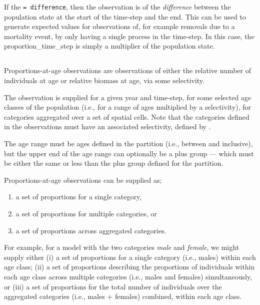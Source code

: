 If the  \texttt{= difference}, then the observation is of the \emph{difference} between the population state at the start of the time-step and the end. This can be used to generate expected values for observations of, for example removals due to a mortality event, by only having a single process in the time-step. In this case, the proportion\_time\_step is simply a multiplier of the population state.

\subsection{}

Proportions-at-age observations are observations of either the relative number of individuals at age or relative biomass at age, via some selectivity. 

The observation is supplied for a given year and time-step, for some selected age classes of the population (i.e., for a range of ages multiplied by a selectivity), for categories aggregated over a set of spatial cells. Note that the categories defined in the observations must have an associated selectivity, defined by .

The age range must be ages defined in the partition (i.e., between  and  inclusive), but the upper end of the age range can optionally be a plus group --- which must be either the same or less than the plus group defined for the partition. 

Proportions-at-age observations can be supplied as; 
\begin{enumerate}
\item a set of proportions for a single category, 
\item a set of proportions for multiple categories, or
\item a set of proportions across aggregated categories.
\end{enumerate}

For example, for a model with the two categories \emph{male} and \emph{female}, we might supply either (i) a set of proportions for a single category (i.e., males) within each age class; (ii) a set of proportions describing the proportions of individuals within each age class across multiple categories (i.e., males and females) simultaneously, or (iii) a set of proportions for the total number of individuals over the aggregated categories  (i.e., males $+$ females) combined, within each age class.

